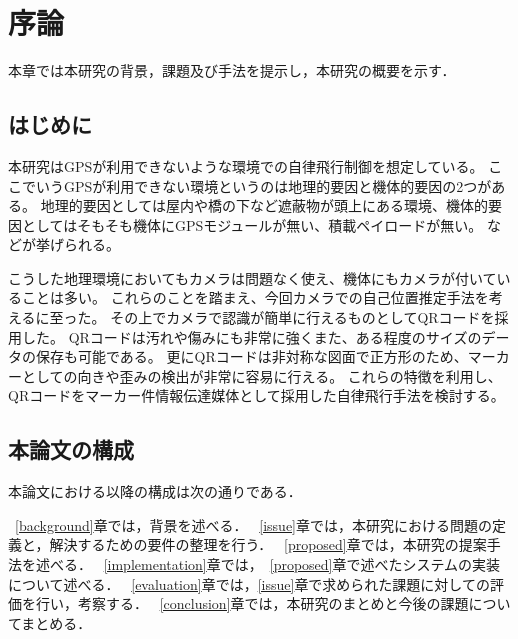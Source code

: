 \chapter{序論}
\label{introduction}

本章では本研究の背景，課題及び手法を提示し，本研究の概要を示す．

\section{はじめに}
\label{introduction:background}
本研究はGPSが利用できないような環境での自律飛行制御を想定している。
ここでいうGPSが利用できない環境というのは地理的要因と機体的要因の2つがある。
地理的要因としては屋内や橋の下など遮蔽物が頭上にある環境、機体的要因としてはそもそも機体にGPSモジュールが無い、積載ペイロードが無い。
などが挙げられる。

こうした地理環境においてもカメラは問題なく使え、機体にもカメラが付いていることは多い。
これらのことを踏まえ、今回カメラでの自己位置推定手法を考えるに至った。
その上でカメラで認識が簡単に行えるものとしてQRコードを採用した。
QRコードは汚れや傷みにも非常に強くまた、ある程度のサイズのデータの保存も可能である。
更にQRコードは非対称な図面で正方形のため、マーカーとしての向きや歪みの検出が非常に容易に行える。
これらの特徴を利用し、QRコードをマーカー件情報伝達媒体として採用した自律飛行手法を検討する。


\section{本論文の構成}

本論文における以降の構成は次の通りである．

~\ref{background}章では，背景を述べる．
~\ref{issue}章では，本研究における問題の定義と，解決するための要件の整理を行う．
~\ref{proposed}章では，本研究の提案手法を述べる．
~\ref{implementation}章では，~\ref{proposed}章で述べたシステムの実装について述べる．
~\ref{evaluation}章では，\ref{issue}章で求められた課題に対しての評価を行い，考察する．
~\ref{conclusion}章では，本研究のまとめと今後の課題についてまとめる．


